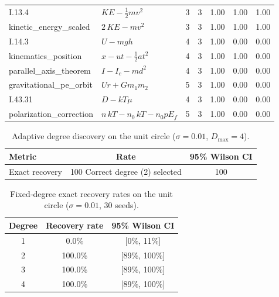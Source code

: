 \documentclass{article}
\begin{document}
\begin{table}[ht]
\begin{tabular}{llccccc}
I.13.4 & $KE-\tfrac12mv^2$ & 3 & 3 & 1.00 & 1.00 & 1.00\\
kinetic_energy_scaled & $2\,KE-mv^2$ & 3 & 3 & 1.00 & 1.00 & 1.00\\
I.14.3 & $U-mgh$ & 4 & 3 & 1.00 & 0.00 & 0.00\\
kinematics_position & $x-ut-\tfrac12at^2$ & 4 & 3 & 1.00 & 1.00 & 0.00\\
parallel_axis_theorem & $I-I_c-md^2$ & 4 & 3 & 1.00 & 0.00 & 0.00\\
gravitational_pe_orbit & $Ur+Gm_1m_2$ & 5 & 3 & 1.00 & 0.00 & 0.00\\
I.43.31 & $D-kT\mu$ & 4 & 3 & 1.00 & 0.00 & 0.00\\
polarization_correction & $n\,kT-n_0\,kT-n_0pE_f$ & 5 & 3 & 1.00 & 0.00 & 0.00\\
\bottomrule
\end{tabular}
\end{table}


\begin{table}[ht]
\centering
\caption{Adaptive degree discovery on the unit circle ($\sigma=0.01$, $D_{\max}=4$).}
\label{tab:adaptive-degree}
\begin{tabular}{lcc}
\toprule
\textbf{Metric} & \textbf{Rate} & \textbf{95\% Wilson CI} \\
\midrule
Exact recovery & 100%
Correct degree (2) selected & 100%
\bottomrule
\end{tabular}
\end{table}


\begin{table}[ht]
\centering
\caption{Fixed‑degree exact recovery rates on the unit circle ($\sigma=0.01$, 30 seeds).}
\label{tab:fixed-degree}
\begin{tabular}{ccc}
\toprule
\textbf{Degree} & \textbf{Recovery rate} & \textbf{95\% Wilson CI} \\
\midrule
1 & 0.0\% & [0\%, 11\%] \\
2 & 100.0\% & [89\%, 100\%] \\
3 & 100.0\% & [89\%, 100\%] \\
4 & 100.0\% & [89\%, 100\%] \\
\bottomrule
\end{tabular}
\end{table}
\end{document}
